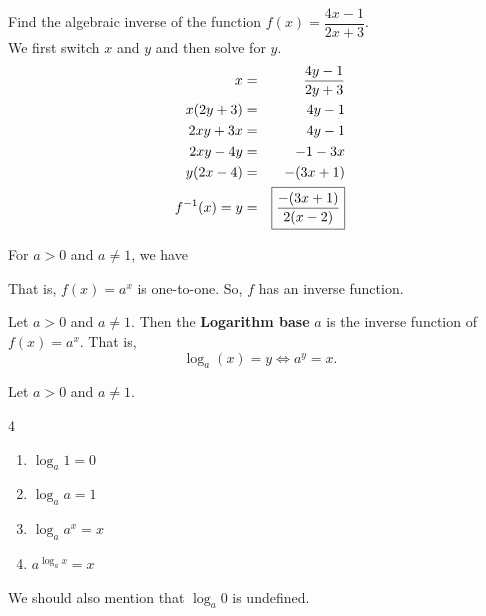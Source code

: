 \documentclass{book}
\begin{document}
\begin{Exam}  Find the algebraic inverse of the function $f(x) = \dfrac{4x-1}{2x+3}$. \\

We first switch $x$ and $y$ and then solve for $y$. 
\begin{eqnarray*}
x &=& \dfrac{4y-1}{2y+3}\\
x(2y+3) &=& 4y-1\\
2xy+3x &=& 4y-1\\
2xy-4y &=& -1-3x\\
y(2x-4) &=& -(3x+1)\\
f^{-1}(x) = y &=& \fbox{$\dfrac{-(3x+1)}{2(x-2)}$}
\end{eqnarray*}
\end{Exam}\vs

For $a > 0$ and $a\neq 1$, we have 

\begin{center}
\end{center}

That is, $f(x) = a^x$ is one-to-one. So, $f$ has an inverse function.

\begin{Def} Let $a>0$ and $a\neq 1$. Then the \textbf{Logarithm base} $a$ is the inverse function of $f(x)=a^x$. That is,
\[\log_a(x) = y \Longleftrightarrow a^y = x.\]
\end{Def}\vs
     
\begin{Thm} Let $a>0$ and $a\neq1$.
\begin{multicols}{4}
\begin{enumerate}[!THM!]
\item $\log_a1 = 0$
\item $\log_aa = 1$
\item $\log_aa^x = x$
\item $a^{\log_ax}=x$
\end{enumerate}
\end{multicols}
\end{Thm}\vs

We should also mention that $\log_a 0$ is undefined.
      
\end{document}
